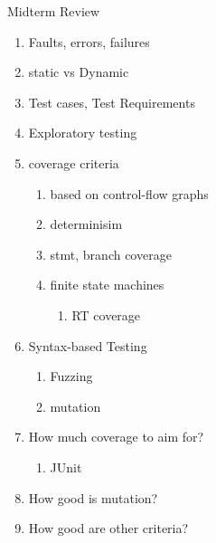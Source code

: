 \documentclass[10pt,usletter]{article}
\begin{document}
Midterm Review
\begin{enumerate}
\item Faults, errors, failures
\item static vs Dynamic
\item Test cases, Test Requirements
\item Exploratory testing
\item coverage criteria
\begin{enumerate}
\item based on control-flow graphs
\item determinisim
\item stmt, branch coverage
\item finite state machines
\begin{enumerate}
\item RT coverage
\end{enumerate}
\end{enumerate}
\item Syntax-based Testing
\begin{enumerate}
\item Fuzzing
\item mutation
\end{enumerate}
\item How much coverage to aim for?
\begin{enumerate}
\item JUnit
\end{enumerate}
\item How good is mutation?
\item How good are other criteria?
\end{enumerate}


\newpage
\end{document}
